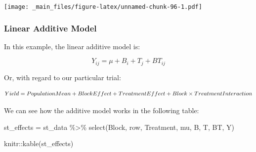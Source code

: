 \documentclass[
]{book}
\newenvironment{Shaded}{\begin{snugshade}}{\end{snugshade}}
\newcommand{\AttributeTok}[1]{\textcolor[rgb]{0.77,0.63,0.00}{#1}}
\newcommand{\DecValTok}[1]{\textcolor[rgb]{0.00,0.00,0.81}{#1}}
\newcommand{\FunctionTok}[1]{\textcolor[rgb]{0.00,0.00,0.00}{#1}}
\newcommand{\NormalTok}[1]{#1}
\newcommand{\OtherTok}[1]{\textcolor[rgb]{0.56,0.35,0.01}{#1}}
\newcommand{\SpecialCharTok}[1]{\textcolor[rgb]{0.00,0.00,0.00}{#1}}
\newcommand{\StringTok}[1]{\textcolor[rgb]{0.31,0.60,0.02}{#1}}
\begin{document}
\begin{Shaded}
\end{Shaded}

\texttt{[image: \_main\_files/figure-latex/unnamed-chunk-96-1.pdf]}

\hypertarget{linear-additive-model}{%
\subsubsection{Linear Additive Model}\label{linear-additive-model}}

In this example, the linear additive model is:

\[ Y_{ij}=\mu + B_i + T_j + BT_{ij}\]

Or, with regard to our particular trial:

\[ Yield = Population \space Mean + Block \space Effect + Treatment \space Effect + Block \times Treatment \space Interaction\]

We can see how the additive model works in the following table:

\begin{Shaded}
\begin{Highlighting}[]
\NormalTok{st\_effects }\OtherTok{=}\NormalTok{ st\_data }\SpecialCharTok{\%\textgreater{}\%}
  \FunctionTok{select}\NormalTok{(Block, row, Treatment, mu, B, T, BT, Y)}

\NormalTok{knitr}\SpecialCharTok{::}\FunctionTok{kable}\NormalTok{(st\_effects)}
\end{Highlighting}
\end{Shaded}
\end{document}
